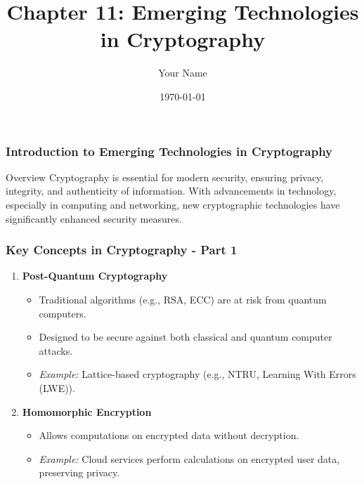 \documentclass{beamer}
\title{Chapter 11: Emerging Technologies in Cryptography}
\author{Your Name}
\institute{Your Institution}
\date{\today}
\begin{document}
\frame{\titlepage}

\begin{frame}[fragile]
    \frametitle{Introduction to Emerging Technologies in Cryptography}
    \begin{block}{Overview}
        Cryptography is essential for modern security, ensuring privacy, integrity, and authenticity of information. With advancements in technology, especially in computing and networking, new cryptographic technologies have significantly enhanced security measures.
    \end{block}
\end{frame}

\begin{frame}[fragile]
    \frametitle{Key Concepts in Cryptography - Part 1}
    \begin{enumerate}
        \item \textbf{Post-Quantum Cryptography}
            \begin{itemize}
                \item Traditional algorithms (e.g., RSA, ECC) are at risk from quantum computers.
                \item Designed to be secure against both classical and quantum computer attacks.
                \item \textit{Example:} Lattice-based cryptography (e.g., NTRU, Learning With Errors (LWE)).
            \end{itemize}
        \item \textbf{Homomorphic Encryption}
            \begin{itemize}
                \item Allows computations on encrypted data without decryption.
                \item \textit{Example:} Cloud services perform calculations on encrypted user data, preserving privacy.
            \end{itemize}
    \end{enumerate}
\end{frame}
\end{document}
